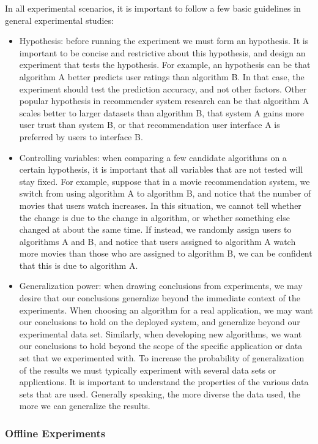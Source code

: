 In all experimental scenarios, it is important to follow a few basic guidelines in general experimental studies:

\begin{itemize}
	\item Hypothesis: before running the experiment we must form an hypothesis. It is important to be concise and restrictive about this hypothesis, and design an experiment that tests the hypothesis. For example, an hypothesis can be that algorithm A better predicts user ratings than algorithm B. In that case, the experiment should test the prediction accuracy, and not other factors. Other popular hypothesis in recommender system research can be that algorithm A scales better to larger datasets than algorithm B, that system A gains more user trust than system B, or that recommendation user interface A is preferred by users to interface B.
	\item Controlling variables: when comparing a few candidate algorithms on a certain hypothesis, it is important that all variables that are not tested will stay fixed. For example, suppose that in a movie recommendation system, we switch from using algorithm A to algorithm B, and notice that the number of movies that users watch increases. In this situation, we cannot tell whether the change is due to the change in algorithm, or whether something else changed at about the same time. If instead, we randomly assign users to algorithms A and B, and notice that users assigned to algorithm A watch more movies than those who are assigned to algorithm B, we can be confident that this is due to algorithm A.
	\item Generalization power: when drawing conclusions from experiments, we may desire that our conclusions generalize beyond the immediate context of the experiments. When choosing an algorithm for a real application, we may want our conclusions to hold on the deployed system, and generalize beyond our experimental data set. Similarly, when developing new algorithms, we want our conclusions to hold beyond the scope of the specific application or data set that we experimented with. To increase the probability of generalization of the results we must typically experiment with several data sets or applications. It is important to understand the properties of the various data sets that are used. Generally speaking, the more diverse the data used, the more we can generalize the results.
\end{itemize}

\subsubsection{Offline Experiments}


